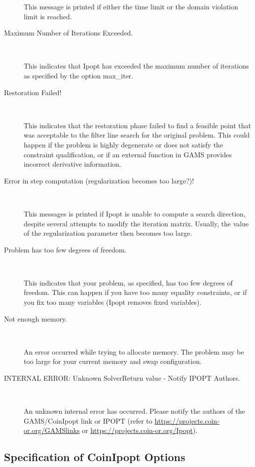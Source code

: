 \begin{description}
    This message is printed if either the time limit or the domain violation limit is reached.

\item[Maximum Number of Iterations Exceeded.] ~

    This indicates that Ipopt has exceeded the maximum number of iterations as specified by the option max\_iter.

\item[Restoration Failed!] ~

    This indicates that the restoration phase failed to find a feasible point that was acceptable to the filter line search for the original problem.
    This could happen if the problem is highly degenerate or does not satisfy the constraint qualification, or if an external function in GAMS provides incorrect derivative information.

\item[Error in step computation (regularization becomes too large?)!] ~

    This messages is printed if Ipopt is unable to compute a search direction, despite several attempts to modify the iteration matrix.
    Usually, the value of the regularization parameter then becomes too large.

\item[Problem has too few degrees of freedom.] ~

    This indicates that your problem, as specified, has too few degrees of freedom.
    This can happen if you have too many equality constraints, or if you fix too many variables (Ipopt removes fixed variables).

\item[Not enough memory.] ~

    An error occurred while trying to allocate memory.
    The problem may be too large for your current memory and swap configuration.

\item[INTERNAL ERROR: Unknown SolverReturn value - Notify IPOPT Authors.] ~

    An unknown internal error has occurred. Please notify the authors of the GAMS/CoinIpopt link or IPOPT (refer to \url{https://projects.coin-or.org/GAMSlinks} or \url{https://projects.coin-or.org/Ipopt}).
\end{description}


\subsection{Specification of CoinIpopt Options}
\label{sub:ipoptoptionspec}

